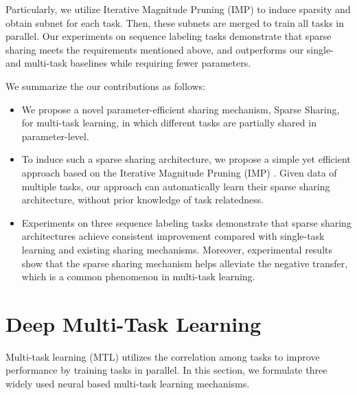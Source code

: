 \documentclass[letterpaper]{article} %
\begin{document}
Particularly, we utilize Iterative Magnitude Pruning (IMP) \cite{DBLP:conf/iclr/FrankleC19} to induce sparsity and obtain subnet for each task. Then, these subnets are merged to train all tasks in parallel. Our experiments on sequence labeling tasks demonstrate that sparse sharing meets the requirements mentioned above, and outperforms our single- and multi-task baselines while requiring fewer parameters.

We summarize the our contributions as follows:
\begin{itemize}
    \item We propose a novel parameter-efficient sharing mechanism, Sparse Sharing, for multi-task learning, in which different tasks are partially shared in parameter-level.
        
    \item To induce such a sparse sharing architecture, we propose a simple yet efficient approach based on the Iterative Magnitude Pruning (IMP) \cite{DBLP:conf/iclr/FrankleC19}. Given data of multiple tasks, our approach can automatically learn their sparse sharing architecture, without prior knowledge of task relatedness.
    
    \item Experiments on three sequence labeling tasks demonstrate that sparse sharing architectures achieve consistent improvement compared with single-task learning and existing sharing mechanisms. Moreover, experimental results show that the sparse sharing mechanism helps alleviate the negative transfer, which is a common phenomenon in multi-task learning.
\end{itemize}

\section{Deep Multi-Task Learning}
Multi-task learning (MTL) utilizes the correlation among tasks to improve performance by training tasks in parallel. In this section, we formulate three widely used neural based multi-task learning mechanisms.
\end{document}
